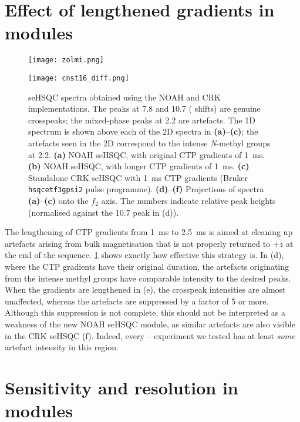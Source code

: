 \section{Effect of lengthened gradients in \texorpdfstring{\nitrogen{}}{15N} modules}

\begin{figure}
    \centering
    \texttt{[image: zolmi.png]}\phantom{aaaaaa}

    \texttt{[image: cnst16\_diff.png]}
    \caption{
        \nitrogen{} seHSQC spectra obtained using the NOAH and CRK implementations.
        The peaks at 7.8 and \SI{10.7}{\ppm} (\proton{} shifts) are genuine crosspeaks; the mixed-phase peaks at \SI{2.2}{\ppm} are artefacts.
        The 1D \proton{} spectrum is shown above each of the 2D spectra in \textbf{(a)}--\textbf{(c)}; the artefacts seen in the 2D correspond to the intense \textit{N}-methyl groups at \SI{2.2}{\ppm}.
        \textbf{(a)} NOAH seHSQC, with original CTP gradients of \SI{1}{\ms}.
        \textbf{(b)} NOAH seHSQC, with longer CTP gradients of \SI{1}{\ms}.
        \textbf{(c)} Standalone CRK seHSQC with \SI{1}{\ms} CTP gradients (Bruker \texttt{hsqcetf3gpsi2} pulse programme).
        \textbf{(d)}--\textbf{(f)} Projections of spectra \textbf{(a)}--\textbf{(c)} onto the $f_2$ axis.
        The numbers indicate relative peak heights (normalised against the \SI{10.7}{\ppm} peak in (d)).
        \zolmi{}
    }
    \label{fig:cnst16_diff}
\end{figure}

The lengthening of CTP gradients from \SI{1}{\ms} to \SI{2.5}{\ms} is aimed at cleaning up artefacts arising from bulk magnetisation that is not properly returned to $+z$ at the end of the sequence.
\cref{fig:cnst16_diff} shows exactly how effective this strategy is.
In (d), where the CTP gradients have their original duration, the artefacts originating from the intense methyl groups have comparable intensity to the desired peaks.
When the gradients are lengthened in (e), the crosspeak intensities are almost unaffected, whereas the artefacts are suppressed by a factor of 5 or more.
Although this suppression is not complete, this should not be interpreted as a weakness of the new NOAH seHSQC module, as similar artefacts are also visible in the CRK seHSQC (f).
Indeed, every \nitrogen{}--\proton{} experiment we tested has at least \textit{some} artefact intensity in this region.

\section{Sensitivity and resolution in \texorpdfstring{\nitrogen{}}{15N} modules}

